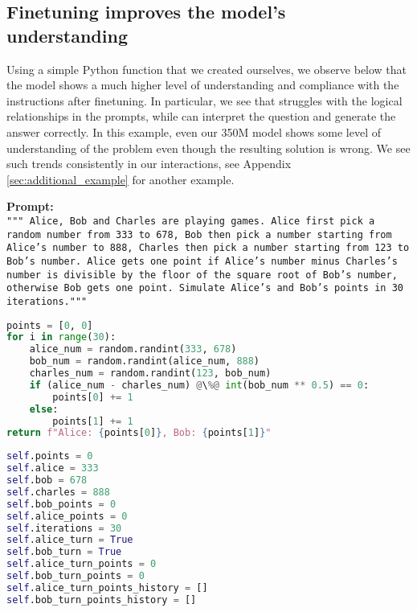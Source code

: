 \subsection{Finetuning improves the model's understanding}
Using a simple Python function that we created ourselves, we observe below that the model shows a much higher level of understanding and compliance with the instructions after finetuning. In particular, we see that {\phionebase} struggles with the logical relationships in the prompts, while \phione can interpret the question and generate the answer correctly. In this example, even our 350M \phionesmall model shows some level of understanding of the problem even though the resulting solution is wrong. %
We see such  trends consistently in our interactions, see Appendix \ref{sec:additional_example} for another example.
\begin{AIbox}{}
\textbf{Prompt:}\\ \tt{\footnotesize""" Alice, Bob and Charles are playing games. Alice first pick a random number from 333 to 678, Bob then pick a number starting from Alice's number to 888, Charles then pick a number starting from 123 to Bob's number. Alice gets one point if Alice's number minus Charles's number is divisible by the floor of the square root of Bob's number, otherwise Bob gets one point. Simulate Alice's and Bob's points in 30 iterations.\newline"""}
\\
\begin{minipage}[t]{0.33\linewidth}
\textbf{\phione}
\begin{lstlisting}[language=Python, style=mystyle]
points = [0, 0]
for i in range(30):
    alice_num = random.randint(333, 678)
    bob_num = random.randint(alice_num, 888)
    charles_num = random.randint(123, bob_num)
    if (alice_num - charles_num) @\%@ int(bob_num ** 0.5) == 0:
        points[0] += 1
    else:
        points[1] += 1
return f"Alice: {points[0]}, Bob: {points[1]}"
\end{lstlisting}
\end{minipage}
\begin{minipage}[t]{0.33\linewidth}
\textbf{\phionebase}
\begin{lstlisting}[language=Python, style=mystyle]
self.points = 0
self.alice = 333
self.bob = 678
self.charles = 888
self.bob_points = 0
self.alice_points = 0
self.iterations = 30
self.alice_turn = True
self.bob_turn = True
self.alice_turn_points = 0
self.bob_turn_points = 0
self.alice_turn_points_history = []
self.bob_turn_points_history = []

\end{lstlisting}
\end{minipage}
\end{AIbox}
